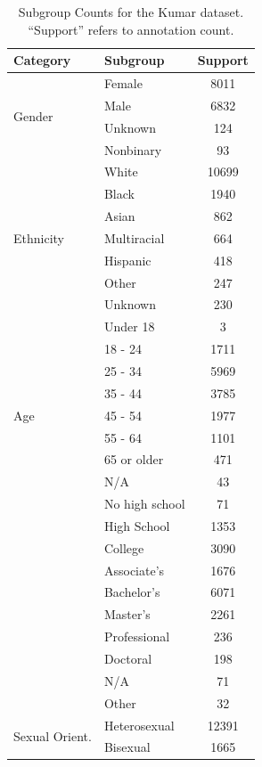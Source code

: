 \documentclass[manuscript,screen,review,anonymous]{acmart}
\theoremstyle{acmplain}
\theoremstyle{researchquestionstyle}
\begin{document}
\begin{table}[t]
	\caption{Subgroup Counts for the Kumar dataset. ``Support'' refers to annotation count.}
	\label{tab:kumar-stats}
	\small
	\centering
	\begin{minipage}[t]{0.45\linewidth}

		\begin{tabular}{llc}
			\toprule
			\textbf{Category} & \textbf{Subgroup} & \textbf{Support}\\
			\midrule
			\multirow{4}{*}{Gender} & Female & 8011 \\
			& Male & 6832 \\
			& Unknown & 124 \\
			& Nonbinary & 93 \\
			\midrule
			\multirow{7}{*}{Ethnicity} & White & 10699 \\
			& Black & 1940 \\
			& Asian & 862 \\
			& Multiracial & 664 \\
			& Hispanic & 418 \\
			& Other & 247 \\
			& Unknown & 230 \\
			\midrule
			\multirow{9}{*}{Age} & Under 18 & 3 \\
			& 18 - 24 & 1711 \\
			& 25 - 34 & 5969 \\
			& 35 - 44 & 3785 \\
			& 45 - 54 & 1977 \\
			& 55 - 64 & 1101 \\
			& 65 or older & 471 \\
			& N/A & 43 \\
			\midrule
			\multirow{10}{*}{Education} & No high school & 71 \\
			& High School & 1353 \\
			& College & 3090 \\
			& Associate's & 1676 \\
			& Bachelor's & 6071 \\
			& Master's & 2261 \\
			& Professional & 236 \\
			& Doctoral & 198 \\
			& N/A & 71 \\
			& Other & 32 \\
			\midrule
			\multirow{5}{*}{Sexual Orient.} & Heterosexual & 12391 \\
			& Bisexual & 1665 \\

\end{tabular}
\end{minipage}
\end{table}
\end{document}
